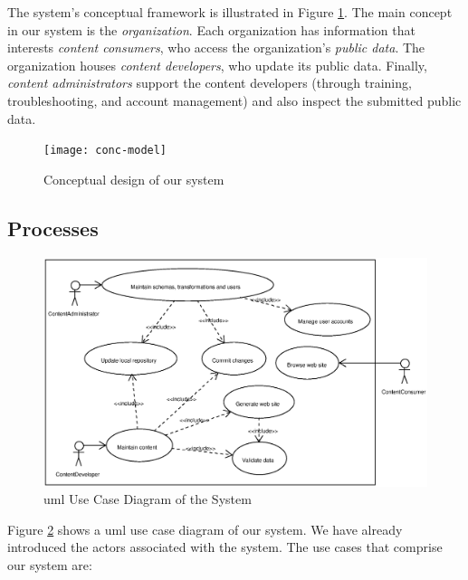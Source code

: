 \documentclass{elsart}
\begin{document}
The system's conceptual framework is illustrated in Figure \ref{fig:conc-model}.
The main concept in our system is the {\em organization}.
Each organization has information that interests {\em content consumers},
who access the organization's {\em public data}.
The organization houses {\em content developers},
who update its public data.
Finally, {\em content administrators} 
support the content developers
(through training, troubleshooting, and account management)
and also inspect the submitted public data.

\begin{figure}[h!]
\begin{center}
\texttt{[image: conc-model]}
\end{center}
\caption{Conceptual design of our system}
\label{fig:conc-model}
\end{figure}

\subsection{Processes}

\begin{figure}[h!]
\includegraphics[scale=0.5]{use-case-diagram}
\caption{{\sc uml} Use Case Diagram of the System}
\label{fig:use-case-diagram}
\end{figure}

Figure \ref{fig:use-case-diagram} shows a {\sc uml} \cite{UML} use case diagram of our system. 
We have already introduced the actors associated with the system.
The use cases that comprise our system are:
\end{document}
